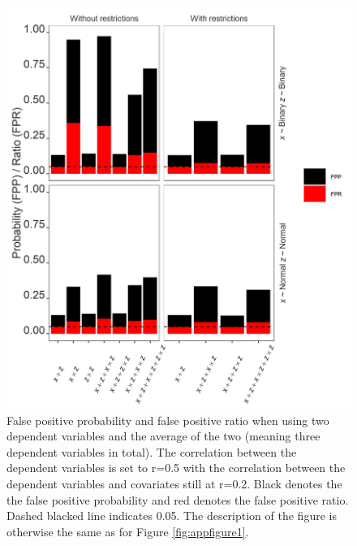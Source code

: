 \begin{figure}[hbt!]
\includegraphics{R/Analysis/Result/Figures/Figure3SI.jpeg}
\centering
\caption{False positive probability and false positive ratio when using two dependent variables and the average of the two (meaning three dependent variables in total). The correlation between the dependent variables is set to r=0.5 with the correlation between the dependent variables and covariates still at r=0.2. Black denotes the the false positive probability and red denotes the false positive ratio. Dashed blacked line indicates 0.05. The description of the figure is otherwise the same as for Figure \ref{fig:appfigure1}.}
\label{fig:appfigure3}
\end{figure}


